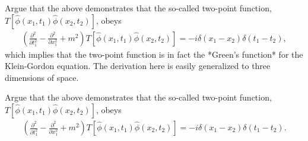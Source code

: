 \documentclass[working, oneside]{../../Preambles/tuftebook}
\begin{document}
\begin{exercise}[5]
Argue that the above demonstrates that the so-called two-point function, $T \left[ \hat{\phi}(x_1, t_1) \hat{\phi}(x_2, t_2) \right]$, obeys
\begin{align*}
\left( \frac{\partial^2}{\partial t_1^2} - \frac{\partial^2}{\partial x_1^2} + m^2 \right) T \left[ \hat{\phi}(x_1, t_1) \hat{\phi}(x_2, t_2) \right] = -i \delta(x_1 - x_2) \delta(t_1 - t_2),
\end{align*}
which implies that the two-point function is in fact the *Green's function* for the Klein-Gordon equation. The derivation here is easily generalized to three dimensions of space.
\end{exercise}
\begin{solution}
Argue that the above demonstrates that the so-called two-point function, $T \left[ \hat{\phi}(x_1, t_1) \hat{\phi}(x_2, t_2) \right]$, obeys
\begin{align*}
\left( \frac{\partial^2}{\partial t_1^2} - \frac{\partial^2}{\partial x_1^2} + m^2 \right) T \left[ \hat{\phi}(x_1, t_1) \hat{\phi}(x_2, t_2) \right] = -i \delta(x_1 - x_2) \delta(t_1 - t_2).
\end{align*}


\end{solution}
\end{document}
